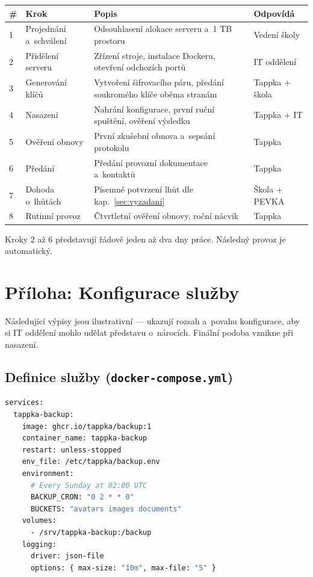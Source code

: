 \documentclass[11pt,a4paper]{article}
\begin{document}
\begin{center}
\begin{tabularx}{\textwidth}{@{}p{0.7cm}p{4.6cm}Xp{2.4cm}@{}}
\toprule
\textbf{\#} & \textbf{Krok} & \textbf{Popis} & \textbf{Odpovídá} \\
\midrule
1 & Projednání a~schválení & Odsouhlasení alokace serveru a~1 TB prostoru & Vedení školy \\
2 & Přidělení serveru & Zřízení stroje, instalace Dockeru, otevření odchozích portů & IT oddělení \\
3 & Generování klíčů & Vytvoření šifrovacího páru, předání soukromého klíče oběma stranám & Tappka $+$ škola \\
4 & Nasazení & Nahrání konfigurace, první ruční spuštění, ověření výsledku & Tappka $+$ IT \\
5 & Ověření obnovy & První zkušební obnova a~sepsání protokolu & Tappka \\
6 & Předání & Předání provozní dokumentace a~kontaktů & Tappka \\
7 & Dohoda o~lhůtách & Písemné potvrzení lhůt dle kap.~\ref{sec:vyzadani} & Škola $+$ PEVKA \\
8 & Rutinní provoz & Čtvrtletní ověření obnovy, roční nácvik & Tappka \\
\bottomrule
\end{tabularx}
\end{center}

\medskip
Kroky 2 až 6 představují řádově jeden až dva dny práce. Následný provoz je automatický.

\newpage

\appendix
\section{Příloha: Konfigurace služby}

Následující výpisy jsou ilustrativní --- ukazují rozsah a~povahu konfigurace, aby si IT oddělení
mohlo udělat představu o~nárocích. Finální podoba vznikne při nasazení.

\subsection{Definice služby (\texttt{docker-compose.yml})}

\begin{lstlisting}[language=bash]
services:
  tappka-backup:
    image: ghcr.io/tappka/backup:1
    container_name: tappka-backup
    restart: unless-stopped
    env_file: /etc/tappka/backup.env
    environment:
      # Every Sunday at 02:00 UTC
      BACKUP_CRON: "0 2 * * 0"
      BUCKETS: "avatars images documents"
    volumes:
      - /srv/tappka-backup:/backup
    logging:
      driver: json-file
      options: { max-size: "10m", max-file: "5" }
\end{lstlisting}
\end{document}
